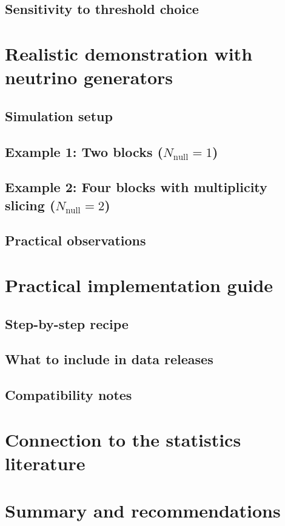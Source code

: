 \documentclass[aps,prd,twocolumn,showpacs,superscriptaddress,floatfix]{revtex4-2}
\begin{document}
\subsection{Sensitivity to threshold choice}

\section{Realistic demonstration with neutrino generators }

\subsection{Simulation setup}

\subsection{Example 1: Two blocks ($N_{\text{null}} = 1$)}

\subsection{Example 2: Four blocks with multiplicity slicing ($N_{\text{null}} = 2$)}

\subsection{Practical observations}

\section{Practical implementation guide}

\subsection{Step-by-step recipe}

\subsection{What to include in data releases}

\subsection{Compatibility notes}

\section{Connection to the statistics literature}

\section{Summary and recommendations}


\end{document}
